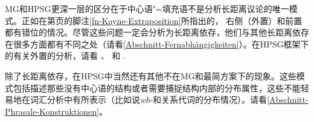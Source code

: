 MG和HPSG更深一层的区分在于中心语"=填充语不是分析长距离议论的唯一模式。正如在第\pageref{fn-Kayne-Extraposition}页的脚注\ref{fn-Kayne-Extraposition}所指出的， 右侧（外置）和前置都有错位的情况。尽管这些问题一定会分析为长距离依存，他们与其他长距离依存在很多方面都有不同之处（请看\ref{Abschnitt-Fernabhängigkeiten}）。在HPSG框架下的有关外置的分析，请看 、 和
 . 

除了长距离依存，在HPSG中当然还有其他不在MG和最简方案下的现象。这些模式包括描述那些没有中心语的结构或者需要捕捉结构内部的分布属性，这些不能轻易地在词汇分析中有所表示（比如说\emph{wh}-和关系代词的分布情况）。请看\ref{Abschnitt-Phrasale-Konstruktionen}。

